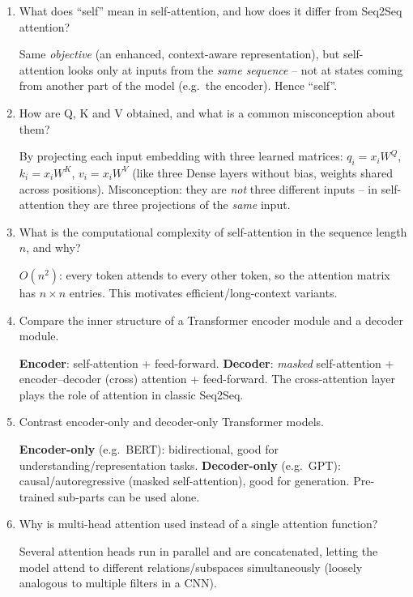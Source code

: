 \documentclass[10pt,a4paper]{article}
\newcommand{\q}[1]{\item #1}
\begin{document}
\begin{enumerate}[leftmargin=*,label=\textbf{Q\arabic*.}]
\q What does ``self'' mean in self-attention, and how does it differ from Seq2Seq attention?
\begin{answerbox}
Same \emph{objective} (an enhanced, context-aware representation), but self-attention looks only at inputs from the \emph{same sequence} -- not at states coming from another part of the model (e.g.\ the encoder). Hence ``self''.
\end{answerbox}

\q How are Q, K and V obtained, and what is a common misconception about them?
\begin{answerbox}
By projecting each input embedding with three learned matrices: $q_i=x_iW^Q$, $k_i=x_iW^K$, $v_i=x_iW^V$ (like three Dense layers without bias, weights shared across positions). Misconception: they are \emph{not} three different inputs -- in self-attention they are three projections of the \emph{same} input.
\end{answerbox}

\q What is the computational complexity of self-attention in the sequence length $n$, and why?
\begin{answerbox}
$O(n^2)$: every token attends to every other token, so the attention matrix has $n\times n$ entries. This motivates efficient/long-context variants.
\end{answerbox}

\q Compare the inner structure of a Transformer encoder module and a decoder module.
\begin{answerbox}
\textbf{Encoder}: self-attention + feed-forward. \textbf{Decoder}: \emph{masked} self-attention + encoder--decoder (cross) attention + feed-forward. The cross-attention layer plays the role of attention in classic Seq2Seq.
\end{answerbox}

\q Contrast encoder-only and decoder-only Transformer models.
\begin{answerbox}
\textbf{Encoder-only} (e.g.\ BERT): bidirectional, good for understanding/representation tasks. \textbf{Decoder-only} (e.g.\ GPT): causal/autoregressive (masked self-attention), good for generation. Pre-trained sub-parts can be used alone.
\end{answerbox}

\q Why is multi-head attention used instead of a single attention function?
\begin{answerbox}
Several attention heads run in parallel and are concatenated, letting the model attend to different relations/subspaces simultaneously (loosely analogous to multiple filters in a CNN).
\end{answerbox}

\end{enumerate}
\end{document}
